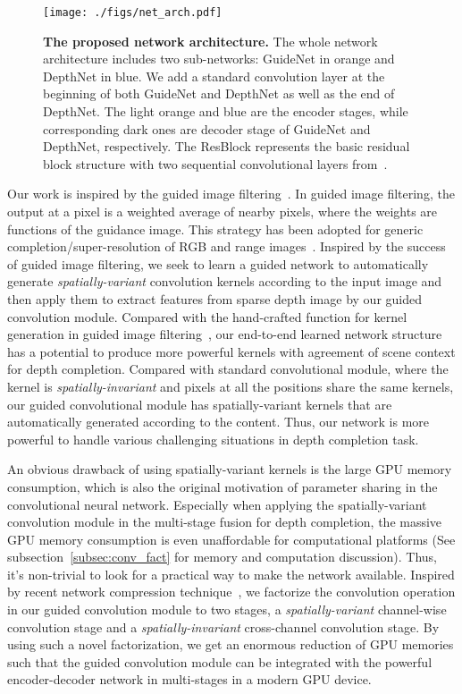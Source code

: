 \documentclass[journal]{IEEEtran}
\begin{document}
\begin{figure*}
\begin{center}
\texttt{[image: ./figs/net\_arch.pdf]}
\end{center}
   \caption{{\bf The proposed network architecture.}
   The whole network architecture includes two sub-networks: GuideNet in orange and DepthNet in blue.
   We add a standard convolution layer at the beginning of both GuideNet and DepthNet as well as the end of DepthNet.
   The light orange and blue are the encoder stages, while corresponding dark ones are decoder stage of GuideNet and DepthNet, respectively.
   The ResBlock represents the basic residual block structure with two sequential  convolutional layers from~\cite{res_net}. }
\label{fig:net_arch}
\end{figure*}


Our work is inspired by the guided image filtering~\cite{guided_filter, bilateral_filter}.
In guided image filtering, the output at a pixel is a weighted average of nearby pixels, where the weights are functions of the guidance image.
This strategy has been adopted for generic completion/super-resolution of RGB and range images~\cite{joint_upsampling, spatial_depth_range, joint_geodesic_upsampling}.
Inspired by the success of guided image filtering, we seek to learn a guided network
to automatically generate \emph{spatially-variant} convolution kernels according to the input image and then apply them to
extract features from sparse depth image by our guided convolution module.
Compared with the hand-crafted function for kernel generation in guided image filtering~\cite{guided_filter},
our end-to-end learned network structure has a potential to produce more powerful kernels with agreement of scene context for depth completion. 
Compared with standard convolutional module, where the kernel is \emph{spatially-invariant} and pixels at all the positions share the same kernels,
our guided convolutional module has spatially-variant kernels that are automatically generated according to the content.
Thus, our network is more powerful to handle various challenging situations in depth completion task.

An obvious drawback of using spatially-variant kernels is the large GPU memory consumption, which is also the original motivation of parameter sharing in the convolutional neural network.
Especially when applying the spatially-variant convolution module in the multi-stage fusion for depth completion,
the massive GPU memory consumption is even unaffordable for computational platforms
(See subsection~\ref{subsec:conv_fact} for memory and computation discussion).
Thus, it's non-trivial to look for a practical way to make the network available.
Inspired by recent network compression technique~\cite{MobileNets}, we factorize the convolution operation in our guided convolution module to two stages,
a \emph{spatially-variant} channel-wise convolution stage and a \emph{spatially-invariant} cross-channel convolution stage.
By using such a novel factorization,
we get an enormous reduction of GPU memories such that the guided convolution module can be integrated with the powerful encoder-decoder network in multi-stages in a modern GPU device.
\end{document}

